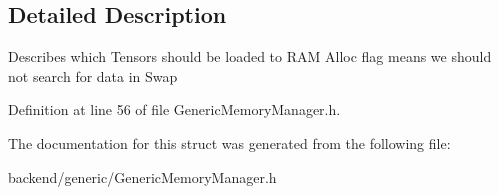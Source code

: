 \subsection{Detailed Description}
Describes which Tensors should be loaded to R\+AM Alloc flag means we should not search for data in Swap 

Definition at line 56 of file Generic\+Memory\+Manager.\+h.



The documentation for this struct was generated from the following file\+:\begin{DoxyCompactItemize}
\item 
backend/generic/Generic\+Memory\+Manager.\+h\end{DoxyCompactItemize}

